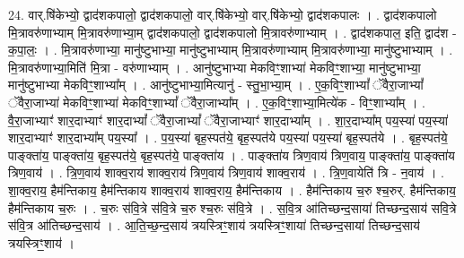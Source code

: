 \documentclass[17pt]{extarticle}
\begin{document}
24. वार्.षि॑केभ्यो॒ द्वाद॑शकपालो॒ द्वाद॑शकपालो॒ वार्.षि॑केभ्यो॒ वार्.षि॑केभ्यो॒ द्वाद॑शकपालः । . द्वाद॑शकपालो मि॒त्रावरु॑णाभ्याम् मि॒त्रावरु॑णाभ्या॒म् द्वाद॑शकपालो॒ द्वाद॑शकपालो मि॒त्रावरु॑णाभ्याम् । . द्वाद॑शकपाल॒ इति॒ द्वाद॑श - क॒पा॒लः॒ । . मि॒त्रावरु॑णाभ्या॒ मानु॑ष्टुभाभ्या॒ मानु॑ष्टुभाभ्याम् मि॒त्रावरु॑णाभ्याम् मि॒त्रावरु॑णाभ्या॒ मानु॑ष्टुभाभ्याम् । . मि॒त्रावरु॑णाभ्या॒मिति॑ मि॒त्रा - वरु॑णाभ्याम् । . आनु॑ष्टुभाभ्या मेकविꣳ॒॒शाभ्या॑ मेकविꣳ॒॒शाभ्या॒ मानु॑ष्टुभाभ्या॒ मानु॑ष्टुभाभ्या मेकविꣳ॒॒शाभ्या᳚म् । . आनु॑ष्टुभाभ्या॒मित्यानु॑ - स्तु॒भा॒भ्या॒म् । . ए॒क॒विꣳ॒॒शाभ्यां᳚ ॅवैरा॒जाभ्यां᳚ ॅवैरा॒जाभ्या॑ मेकविꣳ॒॒शाभ्या॑ मेकविꣳ॒॒शाभ्यां᳚ ॅवैरा॒जाभ्या᳚म् । . ए॒क॒विꣳ॒॒शाभ्या॒मित्ये॑क - विꣳ॒॒शाभ्या᳚म् । . वै॒रा॒जाभ्याꣳ॑ शार॒दाभ्याꣳ॑ शार॒दाभ्यां᳚ ॅवैरा॒जाभ्यां᳚ ॅवैरा॒जाभ्याꣳ॑ शार॒दाभ्या᳚म् । . शा॒र॒दाभ्या᳚म् पय॒स्या॑ पय॒स्या॑ शार॒दाभ्याꣳ॑ शार॒दाभ्या᳚म् पय॒स्या᳚ । . प॒य॒स्या॑ बृह॒स्पत॑ये॒ बृह॒स्पत॑ये पय॒स्या॑ पय॒स्या॑ बृह॒स्पत॑ये । . बृह॒स्पत॑ये॒ पाङ्क्ता॑य॒ पाङ्क्ता॑य॒ बृह॒स्पत॑ये॒ बृह॒स्पत॑ये॒ पाङ्क्ता॑य । . पाङ्क्ता॑य त्रिण॒वाय॑ त्रिण॒वाय॒ पाङ्क्ता॑य॒ पाङ्क्ता॑य त्रिण॒वाय॑ । . त्रि॒ण॒वाय॑ शाक्व॒राय॑ शाक्व॒राय॑ त्रिण॒वाय॑ त्रिण॒वाय॑ शाक्व॒राय॑ । . त्रि॒ण॒वायेति॑ त्रि - न॒वाय॑ । . शा॒क्व॒राय॒ हैम॑न्तिकाय॒ हैम॑न्तिकाय शाक्व॒राय॑ शाक्व॒राय॒ हैम॑न्तिकाय । . हैम॑न्तिकाय च॒रु श्च॒रुर्. हैम॑न्तिकाय॒ हैम॑न्तिकाय च॒रुः । . च॒रुः स॑वि॒त्रे स॑वि॒त्रे च॒रु श्च॒रुः स॑वि॒त्रे । . स॒वि॒त्र आ॑तिच्छन्द॒साया॑ तिच्छन्द॒साय॑ सवि॒त्रे स॑वि॒त्र आ॑तिच्छन्द॒साय॑ । . आ॒ति॒च्छ॒न्द॒साय॑ त्रयस्त्रिꣳ॒॒शाय॑ त्रयस्त्रिꣳ॒॒शाया॑ तिच्छन्द॒साया॑ तिच्छन्द॒साय॑ त्रयस्त्रिꣳ॒॒शाय॑ । \newline
\end{document}
